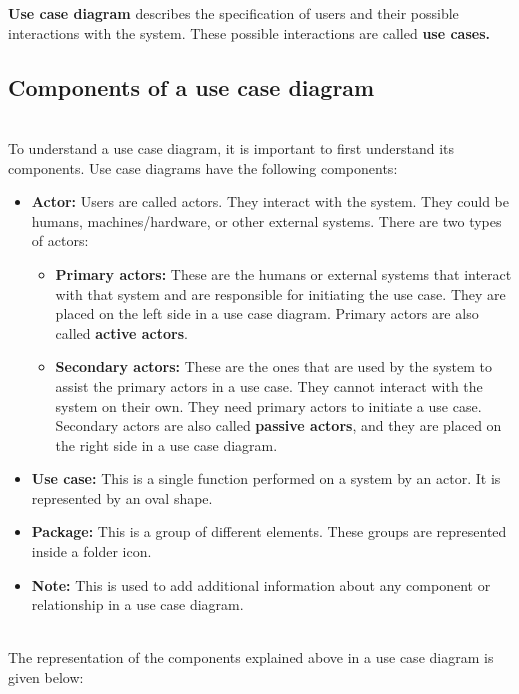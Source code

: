 

\textbf{Use case diagram} describes the specification of users and their possible interactions with the system. These possible interactions are called \textbf{use cases.}

\subsection{Components of a use case diagram}\label{Jr3OajG2dAjHnSXH9Sd1A}
\\
To understand a use case diagram, it is important to first understand its components. Use case diagrams have the following components:

\begin{itemize}
\item
\protect{}\label{efg0yvEHWCt7TJnPVBV-I}
\textbf{Actor:} Users are called actors. They interact with the system. They could be humans, machines/hardware, or other external systems. There are two types of actors:

\begin{itemize}
\item
\textbf{Primary actors:} These are the humans or external systems that interact with that system and are responsible for initiating the use case. They are placed on the left side in a use case diagram. Primary actors are also called \textbf{active actors}.
\item
\textbf{Secondary actors:} These are the ones that are used by the system to assist the primary actors in a use case. They cannot interact with the system on their own. They need primary actors to initiate a use case. Secondary actors are also called \textbf{passive actors}, and they are placed on the right side in a use case diagram.
\end{itemize}
\item
\protect{}\label{L0nZh3f8sQFOoBiqVjLrj}
\textbf{Use case:} This is a single function performed on a system by an actor. It is represented by an oval shape.
\item
\protect{}\label{MjTQrixB2OhNn298U25Ln}
\textbf{Package:} This is a group of different elements. These groups are represented inside a folder icon.
\item
\protect{}\label{e0T4q0daArvBA4Jg7GcO8}
\textbf{Note:} This is used to add additional information about any component or relationship in a use case diagram.
\end{itemize}
\\
The representation of the components explained above in a use case diagram is given below:


